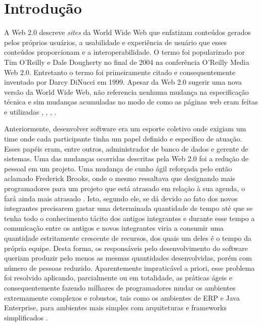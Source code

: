\chapter{Introdução}

A Web 2.0 descreve \textit{sites} da World Wide Web que enfatizam conteúdos gerados pelos próprios usuários, a usabilidade e experiência de usuário que esses conteúdos proporcionam e a interoperabilidade. O termo foi popularizado por Tim O'Reilly e Dale Dougherty no final de 2004 na conferência O'Reilly Media Web 2.0. Entretanto o termo foi primeiramente citado e consequentemente inventado por Darcy DiNucci em 1999. Apesar da Web 2.0 sugerir uma nova versão da World Wide Web, não referencia nenhuma mudança na especificação técnica e sim mudanças acumuladas no modo de como as páginas web eram feitas e utilizadas \cite{graham2005}, \cite{oreilly2005}, \cite{strickland2007}, \cite{dinucci1999}.

	Anteriormente, desenvolver software era um esporte coletivo onde exigiam um time onde cada participante tinha um papel definido e específico de atuação. Esses papéis eram, entre outros, administrador de banco de dados e gerente de sistemas. Uma das mudanças ocorridas descritas pela Web 2.0 foi a redução de pessoal em um projeto. Uma mudança de cunho ágil reforçada pelo então aclamado Frederick Brooks, onde o mesmo ressaltava que designando mais programadores para um projeto que está atrasado em relação à sua agenda, o fará ainda mais atrasado \cite{Brooks:1995:MM:207583}. Isto, segundo ele, se dá devido ao fato dos novos integrantes precisarem gastar uma determinada quantidade de tempo até que se tenha todo o conhecimento tácito dos antigos integrantes e durante esse tempo a comunicação entre os antigos e novos integrantes viria a consumir uma quantidade estritamente crescente de recursos, dos quais um deles é o tempo da própria equipe. Desta forma, os responsáveis pelo desenvolvimento do software queriam produzir pelo menos as mesmas quantidades desenvolvidas, porém com número de pessoas reduzido. Aparentemente impraticável a priori, esse problema foi resolvido aplicando, parcialmente ou em totalidade, as práticas ágeis e consequentemente fazendo milhares de programadores mudar os ambientes extremamente complexos e robustos, tais como os ambientes de ERP e Java Enterprise, para ambientes mais simples com arquiteturas e frameworks simplificados \cite{kent1998}.

